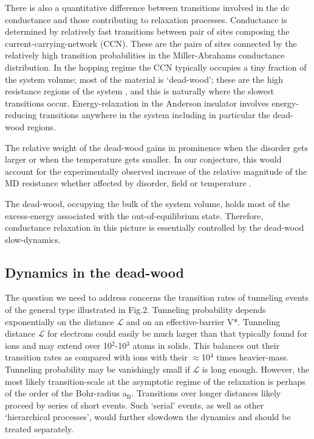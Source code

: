 \documentclass
[preprint,showpacs,byrevtex,10pt,twocolumn,tightenlines,prl,letterpaper]{revtex4}%
\begin{document}
There is also a quantitative difference between transitions involved in the dc
conductance and those contributing to relaxation processes. Conductance is
determined by relatively fast transitions between pair of sites composing the
current-carrying-network (CCN). These are the pairs of sites connected by the
relatively high transition probabilities in the Miller-Abrahams conductance
distribution. In the hopping regime the CCN typically occupies a tiny fraction
of the system volume; most of the material is `dead-wood'; these are the high
resistance regions of the system \cite{40,41,42}, and this is naturally where
the slowest transitions occur. Energy-relaxation in the Anderson insulator
involves energy-reducing transitions anywhere in the system including in
particular the dead-wood regions.

The relative weight of the dead-wood gains in prominence when the disorder
gets larger or when the temperature gets smaller. In our conjecture, this
would account for the experimentally observed increase of the relative
magnitude of the MD resistance whether affected by disorder, field or
temperature \cite{43}.

The dead-wood, occupying the bulk of the system volume, holds most of the
excess-energy associated with the out-of-equilibrium state. Therefore,
conductance relaxation in this picture is essentially controlled by the
dead-wood slow-dynamics.

\subsection{Dynamics in the dead-wood}

The question we need to address concerns the transition rates of tunneling
events of the general type illustrated in Fig.2. Tunneling probability depends
exponentially on the distance $\mathcal{L}$ and on an effective-barrier V*.
Tunneling distance $\mathcal{L}$ for electrons could easily be much larger
than that typically found for ions and may extend over 10$^{\text{2}}%
$-10$^{\text{3}}$ atoms in solids. This balances out their transition rates as
compared with ions with their $\approx$10$^{\text{4}}$ times heavier-mass.
Tunneling probability may be vanishingly small if $\mathcal{L}$ is long
enough. However, the most likely transition-scale at the asymptotic regime of
the relaxation is perhaps of the order of the Bohr-radius a$_{\text{B}}$.
Transitions over longer distances likely proceed by series of short events.
Such `serial' events, as well as other `hierarchical processes', would further
slowdown the dynamics and should be treated separately.
\end{document}
